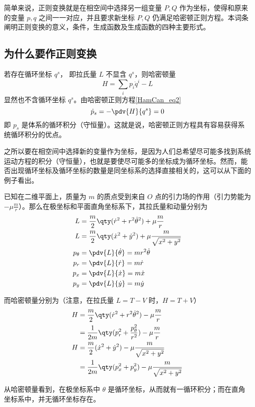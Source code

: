 

简单来说，正则变换就是在相空间中选择另一组变量 $P,Q$ 作为坐标，使得和原来的变量 $p,q$ 之间一一对应，并且要求新坐标 $P,Q$ 仍满足哈密顿正则方程。本词条阐明正则变换的意义，条件，生成函数及生成函数的四种主要形式。
\subsection{为什么要作正则变换}
若存在循环坐标 $q^s$， 即拉氏量 $L$ 不显含 $q^s$，则哈密顿量
\begin{equation}
H=\sum_i p_i\dot q^i-L
\end{equation}
显然也不含循环坐标 $q^s$。由哈密顿正则方程\autoref{HamCan_eq2}~
\begin{equation}\label{CanTra_eq7}
\dot p_s=-\pdv{H}{q^s}=0
\end{equation}
即 $p_s$ 是体系的循环积分（守恒量）。这就是说，哈密顿正则方程具有容易获得系统循环积分的优点。

之所以要在相空间中选择新的变量作为坐标，是因为人们总希望尽可能多找到系统运动方程的积分（守恒量），也就是要使尽可能多的坐标成为循环坐标。然而，能否出现循环坐标及循环坐标的数量是同坐标系的选择直接相关的，这可以从下面的例子看出。
\begin{example}{}
已知在二维平面上，质量为 $m$ 的质点受到来自 $O$ 点的引力场的作用（引力势能为 $-\mu\frac{m}{r}$）。那么在极坐标和平面直角坐标系下，其拉氏量和动量分别为
\begin{equation}
\begin{aligned}
L&=\frac{m}{2}\qty(\dot r^2+r^2\dot\theta^2)+\mu\frac{m}{r}\\
L&=\frac{m}{2}\qty(\dot x^2+\dot y^2)+\mu\frac{m}{\sqrt{x^2+y^2}}\\
p_\theta&=\pdv{L}{\dot \theta}=mr^2\dot\theta\\
p_r&=\pdv{L}{\dot r}=m\dot r\\
p_x&=\pdv{L}{\dot x}=m\dot x\\
p_y&=\pdv{L}{\dot y}=m\dot y
\end{aligned}
\end{equation}

而哈密顿量分别为（注意，在拉氏量 $L=T-V$ 时，$H=T+V$）
\begin{equation}
\begin{aligned}
H&=\frac{m}{2}\qty(\dot r^2+r^2\dot\theta^2)-\mu\frac{m}{r}\\
&=\frac{1}{2m}\qty(p_r^2+\frac{p_\theta^2}{r^2})-\mu\frac{m}{r}\\
H&=\frac{m}{2}(\dot x^2+\dot y^2)-\mu\frac{m}{\sqrt{x^2+y^2}}\\
&=\frac{1}{2m}\qty(p_x^2+p_y^2)-\mu\frac{m}{\sqrt{x^2+y^2}}
\end{aligned}
\end{equation}

从哈密顿量看到，在极坐标系中 $\theta$ 是循环坐标，从而就有一循环积分；而在直角坐标系中，并无循环坐标存在。 
\end{example}

